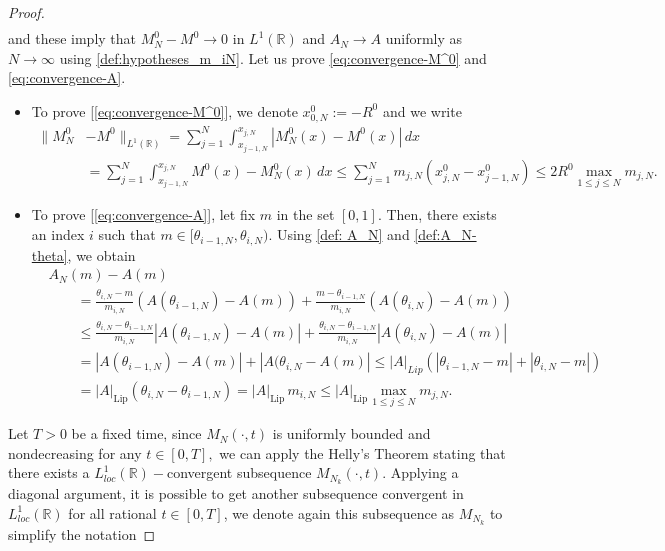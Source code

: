 \documentclass[11pt,a4paper,oneside]{amsart}
\newcommand\R{\mathbb{R}}
\newcommand{\Lip}{\text{Lip}}
\begin{document}
\begin{proof}
\begin{align}
            \label{eq:convergence-A}
        \end{align}
        and these imply that $M_N^0-M^0\to 0$ in $L^1(\R)$ and $A_N\to A$ uniformly as $N\to\infty$ using \eqref{def:hypotheses_m_iN}.\newline
        Let us prove \eqref{eq:convergence-M^0} and \eqref{eq:convergence-A}.
        \begin{itemize}
            \item To prove [\eqref{eq:convergence-M^0}], we denote $x_{0,N}^0:=-R^0$ and we write 
            \begin{align*}
                \|M_N^0&-M^0\|_{L^1(\R)}= \sum_{j=1}^N\int_{x_{j-1,N}}^{x_{j,N}}|M_N^0(x)-M^0(x)|\,dx\\
                &= \sum_{j=1}^N\int_{x_{j-1,N}}^{x_{j,N}}M^0(x)-M_N^0(x)\,dx \leq \sum_{j=1}^N m_{j,N}(x_{j,N}^0-x_{j-1,N}^0)\leq 2R^0\max_{1\leq j\leq N}m_{j,N}.
            \end{align*}
            \item To prove [\eqref{eq:convergence-A}], let fix $m$ in the set $[0,1]$. Then, there exists  an index $i$ such that $m\in[\theta_{i-1,N},\theta_{i,N})$. 
            Using \eqref{def: A_N} and \eqref{def:A_N-theta}, we obtain
            \begin{align*}
                &A_N(m)-A(m)\\
                &\qquad =\frac{\theta_{i,N}-m}{m_{i,N}}(A(\theta_{i-1,N})-A(m))+\frac{m-\theta_{i-1,N}}{m_{i,N}}(A(\theta_{i,N})-A(m))\\
                &\qquad \leq \frac{\theta_{i,N}-\theta_{i-1,N}}{m_{i,N}}|A(\theta_{i-1,N})-A(m)|+\frac{\theta_{i,N}-\theta_{i-1,N}}{m_{i,N}}|A(\theta_{i,N})-A(m)|\\
                &\qquad =|A(\theta_{i-1,N})-A(m)|+|A(\theta_{i,N}-A(m)|\leq |A|_{Lip}(|\theta_{i-1,N}-m|+|\theta_{i,N}-m|)\\
                &\qquad =|A|_{\Lip}(\theta_{i,N}-\theta_{i-1,N})=|A|_{\Lip}\,m_{i,N}\leq |A|_{\Lip}\max_{1\leq j\leq N} m_{j,N}.
            \end{align*}
        \end{itemize}
        Let $T>0$ be a fixed time, since $M_N(\cdot,t)$ is uniformly bounded and nondecreasing for any $t\in[0,T],$ we can apply the Helly's Theorem 
        stating that there exists a $L^1_{loc}(\R)-$convergent subsequence $M_{N_k}(\cdot, t)$. Applying a diagonal argument, it is possible to get 
        another subsequence convergent in $L^1_{loc}(\R)$ for all rational $t\in[0,T]$, we denote again this subsequence as $M_{N_k}$ to simplify the notation 

\end{proof}
\end{document}
